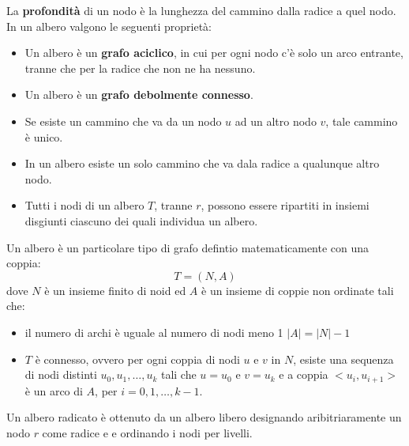 \documentclass[12pt]{report}
\begin{document}
	La \textbf{profondità} di un nodo è la lunghezza del cammino dalla radice a quel nodo. \\
	In un albero valgono le seguenti proprietà:
	\begin{itemize}
		\item Un albero è un \textbf{grafo aciclico}, in cui per ogni nodo c'è solo un arco entrante, tranne che per la radice che non ne ha nessuno.
		\item Un albero è un \textbf{grafo debolmente connesso}.
		\item Se esiste un cammino che va da un nodo $u$ ad un altro nodo $v$, tale cammino è unico.
		\item In un albero esiste un solo cammino che va dala radice a qualunque altro nodo.
		\item Tutti i nodi di un albero $T$, tranne $r$, possono essere ripartiti in insiemi disgiunti ciascuno dei quali individua un albero.
	\end{itemize}
	Un albero è un particolare tipo di grafo defintio matematicamente con una coppia:
	\[
	T = (N, A)
	\]
	dove $N$ è un insieme finito di noid ed $A$ è un insieme di coppie non ordinate tali che:
	\begin{itemize}
		\item il numero di archi è uguale al numero di nodi meno 1 $|A| = |N| - 1$
		\item $T$ è connesso, ovvero per ogni coppia di nodi $u$ e $v$ in $N$, esiste una sequenza di nodi distinti $u_0, u_1, \dots, u_k$ tali che $u = u_0$ e $v = u_k$ e a coppia $<u_i, u_{i+1}>$ è un arco di $A$, per $i = 0, 1, \dots,k-1$.
	\end{itemize}
	Un albero radicato è ottenuto da un albero libero designando aribitriaramente un nodo $r$ come radice e e ordinando i nodi per livelli.
\end{document}
